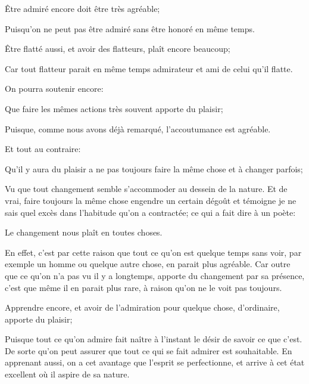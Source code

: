 \bigbreak

\begin{lieu}
	Être admiré encore doit être très agréable;
\end{lieu}

Puisqu'on ne peut pas être admiré sans être honoré en même temps.

\begin{lieu}
	Être flatté aussi, et avoir des flatteurs, plaît encore beaucoup;
\end{lieu}

Car tout flatteur parait en même temps admirateur et ami de celui qu'il flatte.

\bigbreak

On pourra soutenir encore:

\begin{lieu}
	Que faire les mêmes actions très souvent apporte du plaisir;
\end{lieu}

Puisque, comme nous avons déjà remarqué, l'accoutumance est agréable.

Et tout au contraire:

\begin{lieu}
	Qu'il y aura du plaisir a ne pas toujours faire la même chose et à changer parfois;
\end{lieu}

Vu que tout changement semble s'accommoder au dessein de la nature. Et de vrai, faire toujours la même chose
engendre un certain dégoût et témoigne je ne sais quel excès dans l'habitude qu'on a contractée; ce qui a fait
dire à un poète:

\begin{emphpar}
	Le changement nous plaît en toutes choses. 
\end{emphpar}

En effet, c'est par cette raison que tout ce qu'on est quelque temps sans voir, par exemple un homme ou quelque
autre chose, en parait plus agréable. Car outre que ce qu'on n'a pas vu il y a longtemps, apporte du changement
par sa présence, c'est que même il en parait plus rare, à raison qu'on ne le voit pas toujours.

\bigbreak

\begin{lieu}
	Apprendre encore, et avoir de l'admiration pour quelque chose, d'ordinaire, apporte du plaisir;
\end{lieu}

Puisque tout ce qu'on admire fait naître à l'instant le désir de savoir ce que c'est. De sorte qu'on peut
assurer que tout ce qui se fait admirer est souhaitable. En apprenant aussi, on a cet avantage que l'esprit
se perfectionne, et arrive à cet état excellent où il aspire de sa nature.

